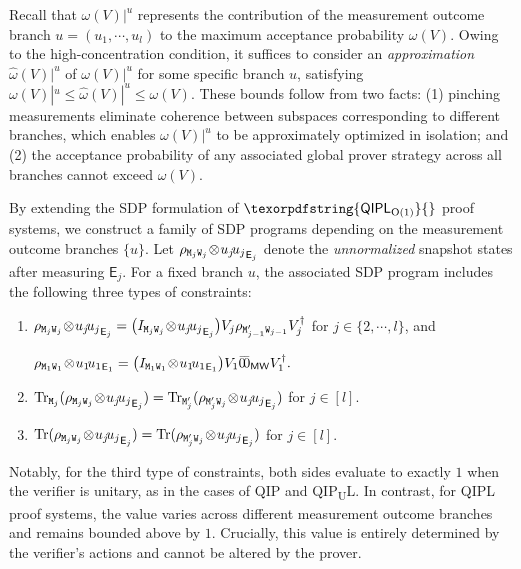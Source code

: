 \documentclass[11pt, a4paper]{article}
\numberwithin{equation}{section}
\numberwithin{figure}{section}
\newcommand{\QIP}{\textnormal{\textsf{QIP}}\xspace}
\newcommand{\QIPL}{\textnormal{\textsf{QIPL}}\xspace}
\newcommand{\QIPLconst}{\texorpdfstring{\textnormal{\textsf{QIPL}\textsubscript{O(1)}}}\xspace}
\newcommand{\QIPUL}{\texorpdfstring{\textnormal{\textsf{QIP}\textsubscript{\textnormal{U}}\textsf{L}}}\xspace}
\let\ket\relax\DeclarePairedDelimiter\ket{\lvert}{\rangle}
\let\bra\relax\DeclarePairedDelimiter\bra{\langle}{\rvert}
\newcommand{\ketbra}[2]{\ensuremath{\ket{#1}\!\bra{#2}}}
\newcommand{\Tr}{\mathrm{Tr}}
\newcommand{\sfE}{\mathsf{E}}
\newcommand{\sfM}{\mathsf{M}}
\newcommand{\sfW}{\mathsf{W}}
\newcommand{\ttM}{\mathtt{M}}
\newcommand{\ttW}{\mathtt{W}}
\begin{document}
Recall that $\omega(V)|^u$ represents the contribution of the measurement outcome branch $u=(u_1,\cdots,u_l)$ to the maximum acceptance probability $\omega(V)$. 
Owing to the high-concentration condition, it suffices to consider an \textit{approximation} $\widehat{\omega}(V)|^u$ of $\omega(V)|^u$ for some specific branch $u$, satisfying $\omega(V)|^u \leq \widehat{\omega}(V)|^u \leq \omega(V)$.
These bounds follow from two facts: (1) pinching measurements eliminate coherence between subspaces corresponding to different branches, which enables $\omega(V)|^u$ to be approximately optimized in isolation; and (2) the acceptance probability of any associated global prover strategy across all branches cannot exceed $\omega(V)$. 

By extending the SDP formulation of $\QIPLconst{}$ proof systems, we construct a family of SDP programs depending on the measurement outcome branches $\{u\}$. 
Let $\rho_{\ttM_j\ttW_j}\!\otimes\! \ketbra{u_j}{u_j}_{\sfE_j}$ denote the \textit{unnormalized} snapshot states after measuring $\sfE_j$. 
For a fixed branch $u$, the associated SDP program includes the following three types of constraints: 
\begin{enumerate}[label={\upshape(\roman*')}, itemsep=0.33em, topsep=0.33em, parsep=0.33em]
    \item $\rho_{\ttM_{j}\ttW_{j}} \!\otimes\! \ketbra{u_{j}}{u_{j}}_{\sfE_{j}} = \big( I_{\ttM_{j}\ttW_{j}} \!\otimes\! \ketbra{u_{j}}{u_{j}}_{\sfE_{j}}\big) V_{j}  \rho_{\ttM'_{j-1}\ttW_{j-1}} V_{j}^{\dagger}$ for $j\in \{2,\cdots,l\}$, and 
    
    $\rho_{\ttM_1\ttW_1} \!\otimes\! \ketbra{u_1}{u_1}_{\sfE_1} = \big( I_{\ttM_1\ttW_1} \!\otimes\! \ketbra{u_1}{u_1}_{\sfE_1}\big) V_1 \ketbra{\bar{0}}{\bar{0}}_{\sfM\sfW}V_1^{\dagger}.$
    \item $\Tr_{\ttM_j}(\rho_{\ttM_j\ttW_j} \!\otimes\! \ketbra{u_j}{u_j}_{\sfE_j}) = \Tr_{\ttM'_j}(\rho_{\ttM'_j\ttW_j} \!\otimes\! \ketbra{u_j}{u_j}_{\sfE_j})$ for $j \in [l]$.
    \item $\Tr(\rho_{\ttM_j\ttW_j} \!\otimes\! \ketbra{u_j}{u_j}_{\sfE_j}) = \Tr(\rho_{\ttM'_j\ttW_j} \!\otimes\! \ketbra{u_j}{u_j}_{\sfE_j})$ for $j \in [l]$.
\end{enumerate}
Notably, for the third type of constraints, both sides evaluate to exactly $1$ when the verifier is unitary, as in the cases of \QIP{} and \QIPUL{}. In contrast, for \QIPL{} proof systems, the value varies across different measurement outcome branches and remains bounded above by $1$. Crucially, this value is entirely determined by the verifier's actions and cannot be altered by the prover. 
\end{document}
